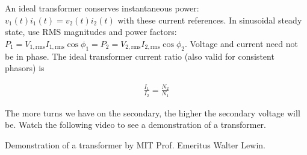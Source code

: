 \documentclass{ximera}
\begin{document}
An ideal transformer conserves instantaneous power: $v_1(t)i_1(t)=v_2(t)i_2(t)$ with these current references. In sinusoidal steady state, use RMS magnitudes and power factors: $P_1=V_{1,\mathrm{rms}}I_{1,\mathrm{rms}}\cos\phi_1=P_2=V_{2,\mathrm{rms}}I_{2,\mathrm{rms}}\cos\phi_2$. Voltage and current need not be in phase. The ideal transformer current ratio (also valid for consistent phasors) is


\begin{eqnarray}
\frac{I_1}{I_2}=\frac{N_2}{N_1} 
\end{eqnarray}





The more turns we have on the secondary, the higher the secondary voltage will be. Watch the following video to see a demonstration of a transformer.

\begin{example}


Demonstration of a transformer by MIT Prof. Emeritus Walter Lewin.
\begin{center}  
\end{center} 

\end{example}
\end{document}
